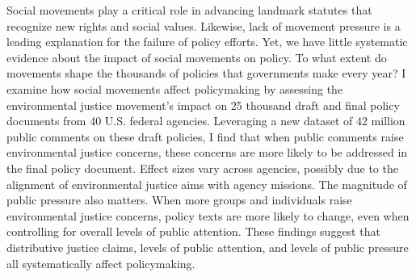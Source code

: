 Social movements play a critical role in advancing landmark statutes that recognize new rights and social values. Likewise, lack of movement pressure is a leading explanation for the failure of policy efforts. Yet, we have little systematic evidence about the impact of social movements on policy. To what extent do movements shape the thousands of policies that governments make every year? I examine how social movements affect policymaking by assessing the environmental justice movement's impact on 25 thousand draft and final policy documents from 40 U.S. federal agencies. Leveraging a new dataset of 42 million public comments on these draft policies, I find that when public comments raise environmental justice concerns, these concerns are more likely to be addressed in the final policy document. Effect sizes vary across agencies, possibly due to the alignment of environmental justice aims with agency missions. The magnitude of public pressure also matters. When more groups and individuals raise environmental justice concerns, policy texts are more likely to change, even when controlling for overall levels of public attention. These findings suggest that distributive justice claims, levels of public attention, and levels of public pressure all systematically affect policymaking.